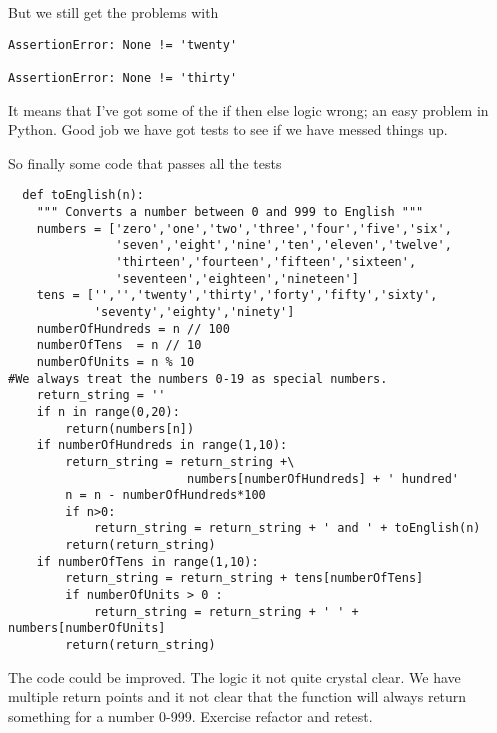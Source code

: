 \documentclass{paper}
\begin{document}
But we still get the problems with 
\begin{verbatim}
AssertionError: None != 'twenty'

AssertionError: None != 'thirty'
\end{verbatim}
It means that I've got some of the if then else logic wrong; an easy
problem in Python. Good job we have got tests to see if we have messed
things up.

So finally some code that passes all the tests
\begin{lstlisting}
  def toEnglish(n):
    """ Converts a number between 0 and 999 to English """
    numbers = ['zero','one','two','three','four','five','six',
               'seven','eight','nine','ten','eleven','twelve',
               'thirteen','fourteen','fifteen','sixteen',
               'seventeen','eighteen','nineteen']
    tens = ['','','twenty','thirty','forty','fifty','sixty',
            'seventy','eighty','ninety']
    numberOfHundreds = n // 100
    numberOfTens  = n // 10
    numberOfUnits = n % 10
#We always treat the numbers 0-19 as special numbers.
    return_string = ''
    if n in range(0,20):
        return(numbers[n])
    if numberOfHundreds in range(1,10):
        return_string = return_string +\
                         numbers[numberOfHundreds] + ' hundred'
        n = n - numberOfHundreds*100
        if n>0:
            return_string = return_string + ' and ' + toEnglish(n)
        return(return_string)
    if numberOfTens in range(1,10):
        return_string = return_string + tens[numberOfTens]
        if numberOfUnits > 0 :
            return_string = return_string + ' ' + numbers[numberOfUnits]
        return(return_string)
\end{lstlisting}
The code could be improved. The logic it not quite crystal clear. We
have multiple return points and it not clear that the function will
always return something for a number 0-999. Exercise refactor and
retest.
\end{document}
